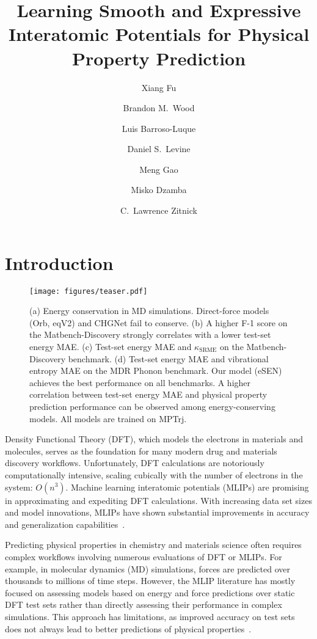 \documentclass[twocolumn]{fairmeta}
\title{Learning Smooth and Expressive Interatomic Potentials for Physical Property Prediction}
\author[1]{Xiang Fu}
\author[1]{Brandon M.\ Wood}
\author[1]{Luis Barroso-Luque}
\author[1]{Daniel S.\ Levine}
\author[1]{Meng Gao}
\author[1]{Misko Dzamba}
\author[1]{C.~Lawrence Zitnick}
\affiliation[1]{Fundamental AI Research (FAIR) at Meta}
\newcommand{\ourmodel}{eSEN}
\begin{document}
\maketitle

\section{Introduction}
\label{sec:intro}

\begin{figure}[t]
\texttt{[image: figures/teaser.pdf]}
\caption{(a) Energy conservation in MD simulations. Direct-force models (Orb, eqV2) and CHGNet fail to conserve. (b) A higher F-1 score on the Matbench-Discovery strongly correlates with a lower test-set energy MAE. (c) Test-set energy MAE and $\kappa_{\mathrm{SRME}}$ on the Matbench-Discovery benchmark. (d) Test-set energy MAE and vibrational entropy MAE on the MDR Phonon benchmark. Our model (\ourmodel) achieves the best performance on all benchmarks. A higher correlation between test-set energy MAE and physical property prediction performance can be observed among energy-conserving models. All models are trained on MPTrj.}
\label{fig:overview}
\end{figure}

Density Functional Theory (DFT), which models the electrons in materials and molecules, serves as the foundation for many modern drug and materials discovery workflows. Unfortunately, DFT calculations are notoriously computationally intensive, scaling cubically with the number of electrons in the system:  $O(n^3)$. Machine learning interatomic potentials (MLIPs) are promising in approximating and expediting DFT calculations. With increasing data set sizes and model innovations, MLIPs have shown substantial improvements in accuracy and generalization capabilities~\citep{batatia2023foundation, merchant2023scaling, yang2024mattersim, barroso2024open}. 

Predicting physical properties in chemistry and materials science often requires complex workflows involving numerous evaluations of DFT or MLIPs. For example, in molecular dynamics (MD) simulations, forces are predicted over thousands to millions of time steps. However, the MLIP literature has mostly focused on assessing models based on energy and force predictions over static DFT test sets rather than directly assessing their performance in complex simulations. This approach has limitations, as improved accuracy on test sets does not always lead to better predictions of physical properties~\citep{pota2024thermal, loew2024universal}. 
\end{document}
